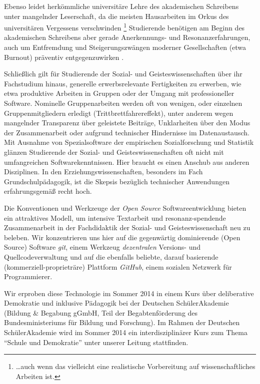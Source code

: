 \documentclass
	[
		11pt,
		a4paper,
		oneside,
		german
	]
	{article}
\begin{document}
Ebenso leidet herkömmliche universitäre Lehre des akademischen Schreibens unter mangelnder Leserschaft, da die meisten Hausarbeiten im Orkus des universitären Vergessens verschwinden
\footnote{
	\ldots auch wenn das vielleicht eine realistische Vorbereitung auf wissenschaftliches Arbeiten ist.
}
Studierende benötigen am Beginn des akademischen Schreibens aber gerade Anerkennungs- und Resonanzerfahrungen, auch um Entfremdung und Steigerungszwängen moderner Gesellschaften (etwa Burnout) präventiv entgegenzuwirken \parencite{Rosa-Paech-etal-2014}.

Schließlich gilt für Studierende der Sozial- und Geisteswissenschaften über ihr Fachstudium hinaus, generelle erwerbsrelevante Fertigkeiten zu erwerben, wie etwa produktive Arbeiten in Gruppen oder der Umgang mit professioneller Software.
Nominelle Gruppenarbeiten werden oft von wenigen, oder einzelnen Gruppenmitgliedern erledigt (Trittbrettfahrereffekt), unter anderem wegen mangelnder Transparenz über geleistete Beiträge, Unklarheiten über den Modus der Zusammenarbeit oder aufgrund technischer Hindernisse im Datenaustausch.
Mit Ausnahme von Spezialsoftware der empirischen Sozialforschung und Statistik glänzen Studierende der Sozial- und Geisteswissenschaften oft nicht mit umfangreichen Softwarekenntnissen.
Hier braucht es einen Anschub aus anderen Disziplinen.
In den Erziehungswissenschaften, besonders im Fach Grundschulpädagogik, ist die Skepsis bezüglich technischer Anwendungen erfahrungsgemäß recht hoch.

Die Konventionen und Werkzeuge der \emph{Open Source} Softwareentwicklung bieten ein attraktives Modell, um intensive Textarbeit und resonanz-spendende  Zusammenarbeit in der Fachdidaktik der Sozial- und Geisteswissenschaft neu zu beleben.
Wir konzentrieren uns hier auf die gegenwärtig dominierende  (Open Source) Software \emph{git}, einem Werkzeug \emph{dezentralen} Versions- und Quellcodeverwaltung und auf die ebenfalls beliebte, darauf basierende (kommerziell-proprieträre) Plattform \emph{GitHub}, einem sozialen Netzwerk für Programmierer.

Wir erproben diese Technologie im Sommer 2014 in einem Kurs über deliberative Demokratie und inklusive Pädagogik bei der Deutschen SchülerAkademie (Bildung \& Begabung gGmbH, Teil der Begabtenförderung des Bundesministeriums für Bildung und Forschung).
Im Rahmen der Deutschen SchülerAkademie wird im Sommer 2014 ein interdisziplinärer Kurs zum Thema ``Schule und Demokratie'' unter unserer Leitung stattfinden.
\end{document}
